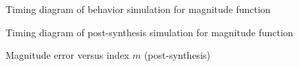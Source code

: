 \documentclass{article}
\begin{document}
\begin{enumerate}
    \begin{figure}[htbp]
        \centering
        \caption{Timing diagram of behavior simulation for magnitude function}
        \label{fig:timing_behav_magnitude}
    \end{figure}

    \begin{figure}[htbp]
        \centering
        \caption{Timing diagram of post-synthesis simulation for magnitude function}
        \label{fig:timing_postsyn_magnitude}
    \end{figure}

    \begin{figure}[htbp]
        \centering
        \caption{Magnitude error versus index $m$ (post-synthesis)}
        \label{fig:error_vs_m_magnitude}
    \end{figure}

\end{enumerate}
\end{document}
